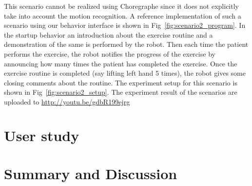 This scenario cannot be realized using Choregraphe since it does not explicitly take into account the motion recognition. A reference implementation of such a scenario using our behavior interface is shown in Fig~\ref{fig:scenario2_program}. In the startup behavior an introduction about the exercise routine and a demonstration of the same is performed by the robot. Then each time the patient performs the exercise, the robot notifies the progress of the exercise by announcing how many times the patient has completed the exercise. Once the exercise routine is completed (say lifting left hand 5 times), the robot gives some closing comments about the routine. The experiment setup for this scenario is shown in Fig~\ref{fig:scenario2_setup}. The experiment result of the scenarios are uploaded to \url{http://youtu.be/gdbR199ejrg}

\section{User study}
\section{Summary and Discussion}